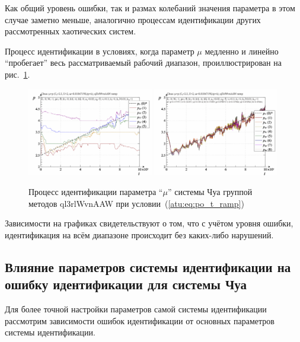 Как общий уровень ошибки, так и размах колебаний значения параметра
в этом случае заметно меньше, аналогично процессам идентификации
других рассмотренных хаотических систем.

Процесс идентификации в условиях, когда параметр
$\mu$ медленно и линейно ``пробегает'' весь рассматриваемый рабочий диапазон,
проиллюстрирован на  рис.~\ref{atu:f:chua_id_ql3rlWvnAAW_ramp}.

\begin{figure}[htb!]
  \centerline{
    \includegraphics[width=0.49\textwidth]{p/cha/chua/ql3rlWvnAAW/chua_id-p_t_pi_ql3rlWvnAAW_ramp.png}
    \hfill
    \includegraphics[width=0.49\textwidth]{p/cha/chua/ql3rlWvnAAW/chua_id-p_t_p_ql3rlWvnAAW_ramp.png}
  }
  \caption{Процесс идентификации параметра ``$\mu$'' системы Чуа группой методов ql3rlWvnAAW при условии~(\ref{atu:eq:po_t_ramp})}
  \label{atu:f:chua_id_ql3rlWvnAAW_ramp}
\end{figure}

Зависимости на графиках свидетельствуют о том, что с учётом уровня
ошибки, идентификация на всём диапазоне происходит без каких-либо
нарушений.




\subsection{Влияние параметров системы идентификации на ошибку идентификации для системы Чуа}  %

Для более точной настройки параметров самой системы идентификации
рассмотрим зависимости ошибок идентификации
от основных параметров системы идентификации.

